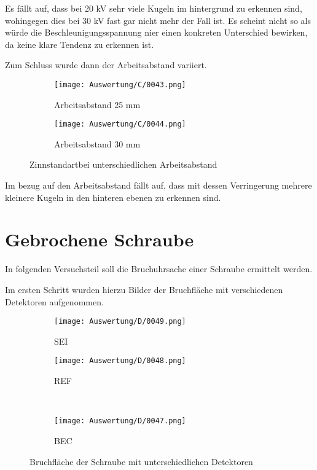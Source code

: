 Es fällt auf, dass bei 20 kV sehr viele Kugeln im hintergrund zu erkennen sind, wohingegen dies bei 30 kV fast gar nicht mehr der Fall ist. Es scheint nicht so als würde die Beschleunigungsspannung nier einen konkreten Unterschied bewirken, da keine klare Tendenz zu erkennen ist.

\newpage
Zum Schluss wurde dann der Arbeitsabstand variiert.
\begin{figure}[h]
    \centering
    
    \begin{subfigure}[b]{0.45\textwidth}
        \centering
        \texttt{[image: Auswertung/C/0043.png]}
        \caption{Arbeitsabstand 25 mm}
    \end{subfigure}
    \hfill
    \begin{subfigure}[b]{0.45\textwidth}
        \centering
        \texttt{[image: Auswertung/C/0044.png]}
        \caption{Arbeitsabstand 30 mm}
    \end{subfigure}
    
    \caption{Zinnstandartbei unterschiedlichen Arbeitsabstand}
\end{figure}

Im bezug auf den Arbeitsabstand fällt auf, dass mit dessen Verringerung mehrere kleinere Kugeln in den hinteren ebenen zu erkennen sind.

\newpage
\section{Gebrochene Schraube}

In folgenden Versuchsteil soll die Bruchuhrsache einer Schraube ermittelt werden.

Im ersten Schritt wurden hierzu Bilder der Bruchfläche mit verschiedenen Detektoren aufgenommen.
\begin{figure}[h]
    \centering
    
    \begin{subfigure}[b]{0.45\textwidth}
        \centering
        \texttt{[image: Auswertung/D/0049.png]}
        \caption{SEI}
    \end{subfigure}
    \hfill
    \begin{subfigure}[b]{0.45\textwidth}
        \centering
        \texttt{[image: Auswertung/D/0048.png]}
        \caption{REF}
    \end{subfigure}
    \\
    \begin{subfigure}[b]{0.45\textwidth}
        \centering
        \texttt{[image: Auswertung/D/0047.png]}
        \caption{BEC}
    \end{subfigure}
    \caption{Bruchfläche der Schraube mit unterschiedlichen Detektoren}
\end{figure}

